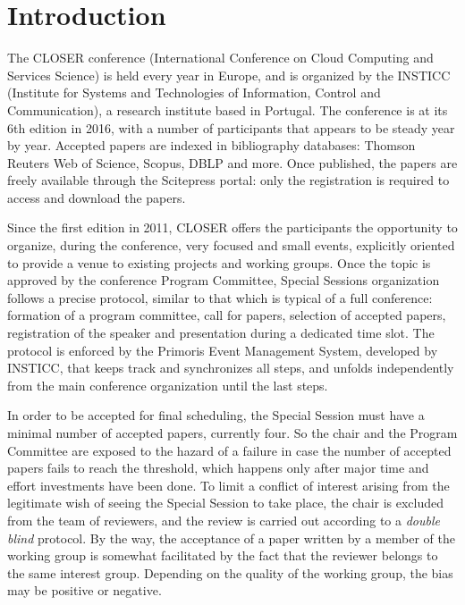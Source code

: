 \documentclass[10pt,a4paper]{article}
\begin{document}



\section{Introduction}
The CLOSER conference (International Conference on Cloud Computing and Services Science) is held every year in Europe, and is organized by the INSTICC (Institute for Systems and Technologies of Information, Control and Communication), a research institute based in Portugal. The conference is at its 6th edition in 2016, with a number of participants that appears to be steady year by year. Accepted papers are indexed in bibliography databases: Thomson Reuters Web of Science, Scopus, DBLP and more. Once published, the papers are freely available through the Scitepress portal: only the registration is required to access and download the papers.

Since the first edition in 2011, CLOSER offers the participants the opportunity to organize, during the conference, very focused and small events, explicitly oriented to provide a venue to existing projects and working groups. Once the topic is approved by the conference Program Committee, Special Sessions organization follows a precise protocol, similar to that which is typical of a full conference: formation of a program committee, call for papers, selection of accepted papers, registration of the speaker and presentation during a dedicated time slot. The protocol is enforced by the Primoris Event Management System, developed by INSTICC, that keeps track and synchronizes all steps, and unfolds independently from the main conference organization until the last steps.

In order to be accepted for final scheduling, the Special Session must have a minimal number of accepted papers, currently four. So the chair and the Program Committee are exposed to the hazard of a failure in case the number of accepted papers fails to reach the threshold, which happens only after major time and effort investments have been done. To limit a conflict of interest arising from the legitimate wish of seeing the Special Session to take place, the chair is excluded from the team of reviewers, and the review is carried out according to a {\em double blind} protocol. By the way, the acceptance of a paper written by a member of the working group is somewhat facilitated by the fact that the reviewer belongs to the same interest group. Depending on the quality of the working group, the bias may be positive or negative.
\end{document}
